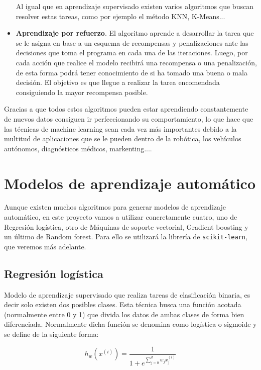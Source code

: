 \documentclass[a4paper, 12pt]{book}
\begin{document}
\begin{itemize}
    Al igual que en aprendizaje supervisado existen varios algoritmos que buscan resolver estas tareas, como por ejemplo el método KNN, K-Means...
    
    \item \textbf{Aprendizaje por refuerzo}. El algoritmo aprende a desarrollar la tarea que se le asigna en base a un esquema de recompensas y penalizaciones ante las decisiones que toma el programa en cada una de las iteraciones. Luego, por cada acción que realice el modelo recibirá una recompensa o una penalización, de esta forma podrá tener conocimiento de si ha tomado una buena o mala decisión. El objetivo es que llegue a realizar la tarea encomendada consiguiendo la mayor recompensa posible.
\end{itemize}

Gracias a que todos estos algoritmos pueden estar aprendiendo constantemente de nuevos datos consiguen ir perfeccionando su comportamiento, lo que hace que las técnicas de machine learning sean cada vez más importantes debido a la multitud de aplicaciones que se le pueden dentro de la robótica, los vehículos autónomos, diagnósticos médicos, markenting....

\section{Modelos de aprendizaje automático}
\label{sec:modelos_aautomatico}

Aunque existen muchos algoritmos para generar modelos de aprendizaje automático, en este proyecto vamos a utilizar concretamente cuatro, uno de Regresión logística, otro de Máquinas de soporte vectorial, Gradient boosting y un último de Random forest. Para ello se utilizará la librería de \texttt{scikit-learn}, que veremos más adelante.

\subsection{Regresión logística}
\label{subsec:regresion_logistica}

Modelo de aprendizaje supervisado que realiza tareas de clasificación binaria, es decir solo existen dos posibles clases. Esta técnica busca una función acotada (normalmente entre 0 y 1) que divida los datos de ambas clases de forma bien diferenciada. Normalmente dicha función se denomina como logística o sigmoide y se define de la siguiente forma:

\begin{equation}
    h_w(x^{(i)}) = \frac{1}{1 + e^{\sum_{j=0}^{d} w_j x_j^{(i)} }}
\end{equation}
\end{document}
